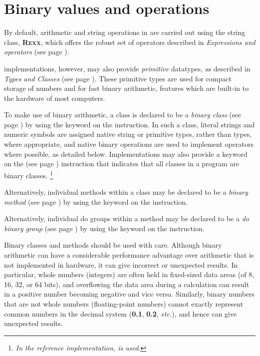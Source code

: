 \chapter{Binary values and operations}\label{refbinary}
 
By default, arithmetic and string operations in \nr{} are carried out
using the \nr{} string class, \textbf{R\textsc{exx}}, which offers the robust
set of operators described in \emph{Expressions and operators} (see page \pageref{refexpr}).
 
\nr{} implementations, however, may also provide \emph{primitive}
datatypes, as described in  \emph{Types and Classes} (see page \pageref{refprims}). These primitive types are used for compact storage
of numbers and for fast binary arithmetic, features which are built-in
to the hardware of most computers.
 
To make use of binary arithmetic, a class is declared to be a
 \emph{binary class} (see page \pageref{refbincla})  by using the 
keyword on the  instruction.
In such a class, literal strings and numeric symbols are assigned native
string or primitive types, rather than \nr{} types, where appropriate,
and native binary operations are used to implement operators where
possible, as detailed below.
Implementations may also provide a keyword on the
  (see page \pageref{refoptions})  instruction that indicates that
all classes in a program are binary classes.
\footnote{
\emph{In the reference implementation,  is
used}.
}
 
Alternatively, individual methods within a class may be declared to
be a  \emph{binary method} (see page \pageref{refbinme})  by using the 
keyword on the  instruction.

Alternatively, individual do groups within a method may be declared to
be a  \emph{do binary group} (see page \pageref{refdo})  by using the 
keyword on the  instruction.
 
Binary classes and methods should be used with care.  Although binary
arithmetic can have a considerable performance advantage over
arithmetic that is not implemented in hardware, it can give incorrect
or unexpected results.
In particular, whole numbers (integers) are often held in fixed-sized
data areas (of 8, 16, 32, or 64 bits), and overflowing the data area
during a calculation can result in a positive number becoming negative
and vice versa.
Similarly, binary numbers that are not whole numbers (floating-point
numbers) cannot exactly represent common numbers in the decimal system
(\textbf{0.1}, \textbf{0.2}, \emph{etc.}), and hence can give unexpected
results.
